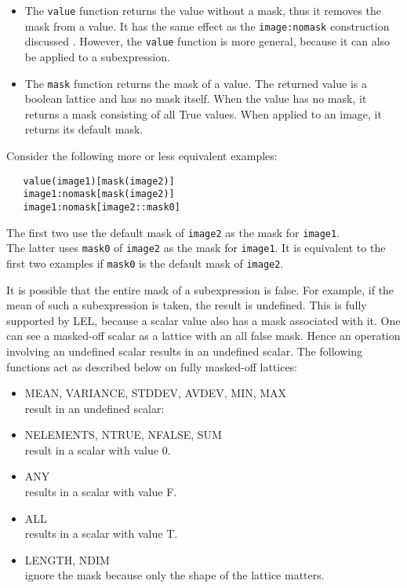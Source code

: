 \begin{itemize}
\item
The \texttt{value} function returns the value without a mask, thus
it removes the mask from a value.
It has the same effect as the \texttt{image:nomask} construction
discussed . However, the \texttt{value}
function is more general, because it can also be applied to a
subexpression.

\item
The \texttt{mask} function returns the mask of a value.
The returned value is a boolean lattice and has no mask itself.
When the value has no mask, it returns a mask consisting of all True values.
When applied to an image, it returns its default mask.
\end{itemize}

Consider the following more or less equivalent examples:
\begin{verbatim}
   value(image1)[mask(image2)]
   image1:nomask[mask(image2)]
   image1:nomask[image2::mask0]
\end{verbatim}
The first two use the default mask of \texttt{image2} as the mask for
\texttt{image1}.
\\The latter uses \texttt{mask0} of \texttt{image2} as the mask for
\texttt{image1}. It is equivalent to the first two examples if
\texttt{mask0} is the default mask of \texttt{image2}.


\medskip\noindent It is possible that the entire mask of a subexpression is false.  For example,
if the mean of such a subexpression is taken, the result is
undefined.  This is fully supported by LEL, because a scalar value also
has a mask associated with it.  One can see a masked-off scalar as a
lattice with an all false mask.  Hence an operation involving an
undefined scalar results in an undefined scalar.  The following
functions act as described below on fully masked-off lattices:

\begin{itemize}
\item MEAN, VARIANCE, STDDEV, AVDEV, MIN, MAX
\\result in an undefined scalar:
\item NELEMENTS, NTRUE, NFALSE, SUM
\\result in a scalar with value 0.
\item ANY
\\results in a scalar with value F.
\item ALL
\\results in a scalar with value T.
\item LENGTH, NDIM
\\ignore the mask because only the shape of the lattice matters.
\end{itemize}

